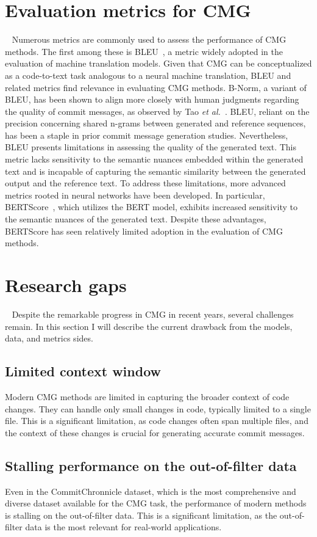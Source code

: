 \section{Evaluation metrics for CMG}~\label{sec:eval_metrics}
Numerous metrics are commonly used to assess the performance of CMG methods. The first among these is BLEU~\cite{papineni2002bleu}, a metric widely adopted in the evaluation of machine translation models. Given that CMG can be conceptualized as a code-to-text task analogous to a neural machine translation, BLEU and related metrics find relevance in evaluating CMG methods. B-Norm, a variant of BLEU, has been shown to align more closely with human judgments regarding the quality of commit messages, as observed by Tao \textit{et al.}~\cite{tao2021evaluation}.
BLEU, reliant on the precision concerning shared n-grams between generated and reference sequences, has been a staple in prior commit message generation studies.
Nevertheless, BLEU presents limitations in assessing the quality of the generated text. This metric lacks sensitivity to the semantic nuances embedded within the generated text and is incapable of capturing the semantic similarity between the generated output and the reference text. To address these limitations, more advanced metrics rooted in neural networks have been developed. In particular, BERTScore~\cite{zhang2019bertscore}, which utilizes the BERT model, exhibits increased sensitivity to the semantic nuances of the generated text. Despite these advantages, BERTScore has seen relatively limited adoption in the evaluation of CMG methods.

\section{Research gaps}~\label{sec:research_gap}
Despite the remarkable progress in CMG in recent years, several challenges remain. In this section I will describe the current drawback from the models, data, and metrics sides.
\subsection{Limited context window}
Modern CMG methods are limited in capturing the broader context of code changes. They can handle only small changes in code, typically limited to a single file. This is a significant limitation, as code changes often span multiple files, and the context of these changes is crucial for generating accurate commit messages.

\subsection{Stalling performance on the out-of-filter data}
Even in the CommitChronnicle dataset, which is the most comprehensive and diverse dataset available for the CMG task, the performance of modern methods is stalling on the out-of-filter data. This is a significant limitation, as the out-of-filter data is the most relevant for real-world applications.

